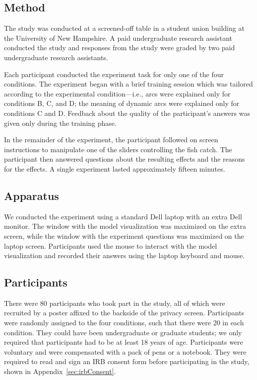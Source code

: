 \subsection{Method}

The study was conducted at a screened-off table in a student union building at the University of New Hampshire.  A paid undergraduate research assistant conducted the study and responses from the study were graded by two paid undergraduate research assistants.

Each participant conducted the experiment task for only one of the four conditions.  The experiment began with a brief training session which was tailored according to the experimental condition---i.e., arcs were explained only for conditions B, C, and D; the meaning of dynamic arcs were explained only for conditions C and D.  Feedback about the quality of the participant's answers was given only during the training phase.  

In the remainder of the experiment, the participant followed on screen instructions to manipulate one of the sliders controlling the fish catch.  The participant then answered questions about the resulting effects and the reasons for the effects.  A single experiment lasted approximately fifteen minutes.

\subsection{Apparatus}

We conducted the experiment using a standard Dell laptop with an extra Dell monitor.  The window with the model visualization was maximized on the extra screen, while the window with the experiment questions was maximized on the laptop screen.  Participants used the mouse to interact with the model visualization and recorded their answers using the laptop keyboard and mouse.

\subsection{Participants} \label{sec:participants}

There were 80 participants who took part in the study, all of which were recruited by a poster affixed to the backside of the privacy screen.  Participants were randomly assigned to the four conditions, such that there were 20 in each condition.  They could have been undergraduate or graduate students; we only required that participants had to be at least 18 years of age.  Participants were voluntary and were compensated with a pack of pens or a notebook.  They were required to read and sign an IRB consent form before participating in the study, shown in Appendix~\ref{sec:irbConsent}.

